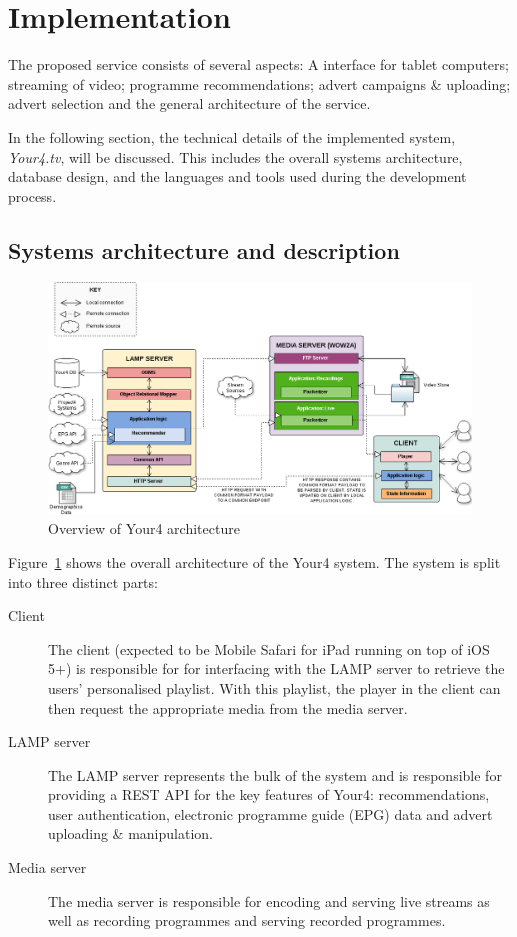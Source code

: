 \section{Implementation}

The proposed service consists of several aspects: A interface for tablet computers; streaming of video; programme recommendations; advert campaigns \& uploading; advert selection and the general architecture of the service.

In the following section, the technical details of the implemented system, \textit{Your4.tv}, will be discussed. This includes the overall systems architecture, database design, and the languages and tools used during the development process.

\subsection{Systems architecture and description}

\begin{figure}[H]
	\centering
	\includegraphics[width=\textwidth]{images/your4-architecture.png}
	\caption{Overview of Your4 architecture}
	\label{fig:your4-architecture}
\end{figure}

Figure~\ref{fig:your4-architecture} shows the overall architecture of the Your4 system. The system is split into three distinct parts:

\begin{description}
	\item[Client] The client (expected to be Mobile Safari for iPad running on top of iOS 5+) is responsible for for interfacing with the LAMP server to retrieve the users' personalised playlist. With this playlist, the player in the client can then request the appropriate media from the media server.
	\item[LAMP server] The LAMP server represents the bulk of the system and is responsible for providing a REST API for the key features of Your4: recommendations, user authentication, electronic programme guide (EPG) data and advert uploading \& manipulation.
	\item[Media server] The media server is responsible for encoding and serving live streams as well as recording programmes and serving recorded programmes.
\end{description}

